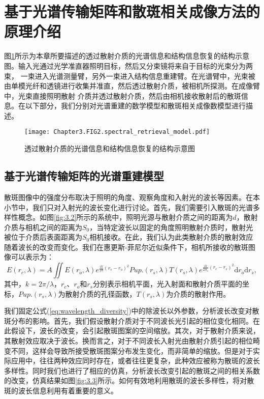 \section{基于光谱传输矩阵和散斑相关成像方法的原理介绍}
图\ref{fig:3.1}所示为本章所要描述的透过散射介质的光谱信息和结构信息恢复的结构示意图。输入光通过光学准直器照明目标，然后又分束镜将来自于目标的光束分为两束，
一束进入光谱测量臂，另外一束进入结构信息重建臂。在光谱臂中，光束被由单模光纤和透镜进行收集并准直，然后透过散射介质，被相机所探测。在成像臂中，光束直接照明散射
介质并透过散射介质，然后由相机接收散射后的散斑信息。在以下部分，我们分别对光谱重建的数学模型和散斑相关成像数模型进行描述。
\begin{figure}[htp]
	\centering
	\texttt{[image: Chapter3.FIG2.spectral\_retrieval\_model.pdf]}
	\caption{透过散射介质的光谱信息和结构信息恢复的结构示意图}
	\label{fig:3.1}
\end{figure}

\subsection{基于光谱传输矩阵的光谱重建模型}
散斑图像中的强度分布取决于照明的角度、观察角度和入射光的波长等因素。在本小节中，我们只对入射光的波长变化进行讨论。首先，我们需要引入散斑的光谱多样性概念。如图\ref{fig:3.2}所示的系统中，照明光源与散射介质之间的距离为$d$，散射介质与相机之间的距离为$S_{0}$，当特定波长以固定的角度照明散射介质时，散射光被位于介质后表面距离为$S_{0}$相机接收。在此，我们认为此类散射介质的散射效应随着波长的改变而变化。我们在惠更斯-菲尼尔近似条件下，相机所接收的散斑图像可以表示为：
\begin{equation}
    E(r_{c},\lambda) = A\iint E(r_{o},\lambda)e^{\frac{ik}{2d}(r_{s}-r_{o})^{2}}Pup.(r_{s},\lambda)T(r_{s},\lambda)e^{\frac{ik}{2S_{o}}(r_{c}-r_{s})^{2}}\mathrm{d}{r_{o}}\mathrm{d}{r_{s}}
\label{eq:wavelength_diversity},
\end{equation}
其中，$k =2\pi/\lambda$，$r_{c}$、$r_{o}$和$r_{s}$分别表示相机平面，光入射面和散射介质平面的坐标，$Pup.(r_{s},\lambda)$为散射介质的孔径函数，$T(r_{s},\lambda)$为介质的散射作用。

我们固定公式(\ref{eq:wavelength_diversity})中的除波长以外参数，分析波长改变对散斑分布的影响。首先，我们假设散射介质对于不同波长光引起的相位变化相同。在此假设下，波长的改变，会引起散斑图案的空间缩放。其次，对于散射介质来说，其散射效应取决于波长。换而言之，对于不同波长入射光由散射介质引起的相位畸变不同，这样会导致所接受散斑图案分布发生变化，而非简单的缩放。但是对于实际应用中，往往两种效应同时存在，或者往往更复杂，此种效应被称为散斑的波长多样性。同时我们也进行了相应的仿真，分析波长改变引起的散斑之间的相关系数的改变，仿真结果如图\ref{fig:3.3}所示。如何有效地利用散斑的波长多样性，将对散斑的波长信息利用有着重要的意义。

